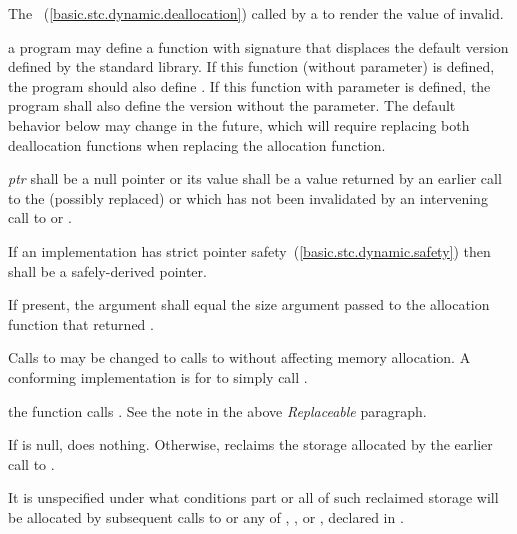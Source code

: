 \begin{itemdescr}
\pnum
\effects
The
~(\ref{basic.stc.dynamic.deallocation})
called by a
to render the value of  invalid.

\pnum
\replaceable
a \Cpp program may define a function with signature
that displaces the default version defined by the
\Cpp standard library. If this function (without  parameter) is defined,
the program should also define
.
If this function with  parameter is defined, the program shall also
define the version without the  parameter.
\enternote The default behavior below may change in the future, which will require
replacing both deallocation functions when replacing the allocation function.
\exitnote

\pnum
\requires
\textit{ptr} shall be a null pointer or
its value shall be a value returned by an
earlier call to the (possibly replaced)
or
which has not been invalidated by an intervening call to
 or
.

\pnum
\requires
If an implementation has strict pointer safety~(\ref{basic.stc.dynamic.safety})
then  shall be a safely-derived pointer.

\pnum
\requires If present, the  argument shall equal the size
argument passed to the allocation function that returned .

\pnum
\required Calls to  may be changed
to calls to  without affecting memory allocation.
\enternote A conforming implementation is for
 to simply call
. \exitnote

\pnum
{} the function  calls
.
\enternote See the note in the above \textit{Replaceable} paragraph. \exitnote

\pnum
{}
If  is null, does nothing. Otherwise, reclaims the
storage allocated by the earlier call to .

\pnum
\notes
It is unspecified under what conditions part or all of such
%
reclaimed storage will be allocated by subsequent
calls to
or any of
,
,
or
,
declared in
.
\end{itemdescr}

